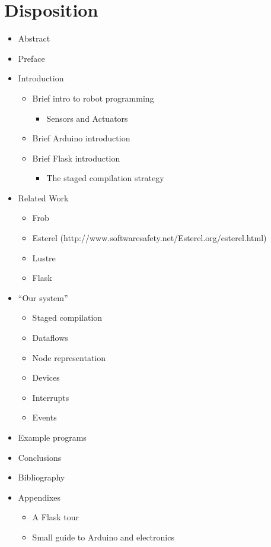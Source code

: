 \documentclass[a4paper, oneside, final]{memoir}
\begin{document}
\chapter{Disposition}
\begin{itemize}
\item Abstract

\item Preface 

\item Introduction
  \begin{itemize}
  \item Brief intro to robot programming
    \begin{itemize}
     \item Sensors and Actuators
    \end{itemize}
  \item Brief Arduino introduction
  \item Brief Flask introduction
    \begin{itemize}
     \item The staged compilation strategy
    \end{itemize}
  \end{itemize}

\item Related Work
  \begin{itemize}
  \item Frob
  \item Esterel
    (http://www.softwaresafety.net/Esterel.org/esterel.html)
  \item Lustre \cite{lustre91}
  \item Flask
  \end{itemize}

\item "`Our system"'
  \begin{itemize}
  \item Staged compilation
  \item Dataflows
  \item Node representation
  \item Devices
  \item Interrupts
  \item Events
  \end{itemize}

\item Example programs

\item Conclusions

\item Bibliography

\item Appendixes
  \begin{itemize}
  \item A Flask tour
  \item Small guide to Arduino and electronics
  \end{itemize}
\end{itemize}  
\end{document}
